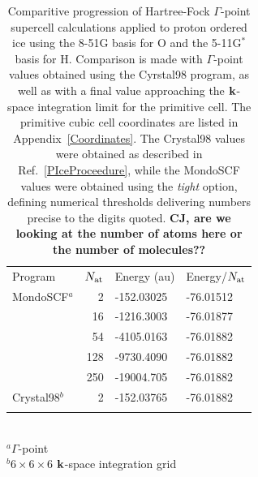 \documentclass[prb,aps,nobibnotes,twocolumn,doublespace,twocolumngrid,superbib]{revtex4}
\begin{document}
\pagebreak

\begin{table}
\caption{
Comparitive progression of Hartree-Fock $\Gamma$-point supercell calculations 
applied to proton ordered ice using the 8-51G basis for O and the 5-11G$^*$ basis for H.
Comparison is made with $\Gamma$-point values obtained using the {\sc Cyrstal98} program, 
as well as with a final value approaching the $\bf k$-space integration limit for the 
primitive cell.  The primitive cubic cell coordinates are listed in Appendix~\ref{Coordinates}.
The {\sc Crystal98} values were obtained as described in Ref.~\ref{PIceProceedure}, while 
the {\sc MondoSCF} values were obtained using the {\it tight} option, defining numerical 
thresholds delivering numbers precise to the digits quoted. {\bf CJ, are we looking at the
number of atoms here or the number of molecules??}} \label{PIceTable}
\label{table:ComToCrystal98_Ice}
\begin{tabular}{lrll}
\toprule
Program         & $N_{\rm at}$              & Energy (au)    & Energy/$N_{\rm at}$\\ 
\colrule
{\sc MondoSCF}$^a$  & 2    &  -152.03025  &  -76.01512  \\
                    & 16   &  -1216.3003  &  -76.01877  \\
                    & 54   &  -4105.0163  &  -76.01882  \\
                    & 128  &  -9730.4090  &  -76.01882  \\
                    & 250  &  -19004.705  &  -76.01882  \\ 
\hline
{\sc Crystal98}$^b$  & 2   &  -152.03765  &  -76.01882  \\ 
\botrule
\end{tabular}\\
$^a \Gamma$-point\\
$^b 6\times6\times6$ $\bf k$-space integration grid \\
\end{table}

\pagebreak
\end{document}
